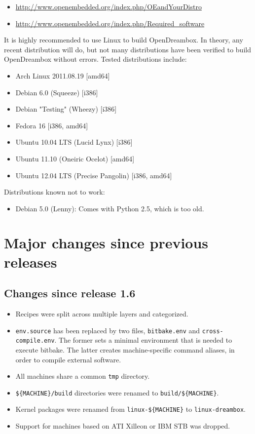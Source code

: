 \documentclass[a4paper]{article}
\newcommand{\shell}[1]{\texttt{\small #1}}
\begin{document}
   \begin{itemize}
     \item \url{http://www.openembedded.org/index.php/OEandYourDistro}
     \item \url{http://www.openembedded.org/index.php/Required\_software}
   \end{itemize}

   It is highly recommended to use Linux to build OpenDreambox. In theory,
   any recent distribution will do, but not many distributions have been
   verified to build OpenDreambox without errors. Tested distributions
   include:

   \begin{itemize}
     \item Arch Linux 2011.08.19 [amd64]
     \item Debian 6.0 (Squeeze) [i386]
     \item Debian "Testing" (Wheezy) [i386]
     \item Fedora 16 [i386, amd64]
     \item Ubuntu 10.04 LTS (Lucid Lynx) [i386]
     \item Ubuntu 11.10 (Oneiric Ocelot) [amd64]
     \item Ubuntu 12.04 LTS (Precise Pangolin) [i386, amd64]
   \end{itemize}

   Distributions known not to work:

   \begin{itemize}
     \item Debian 5.0 (Lenny): Comes with Python 2.5, which is too old.
   \end{itemize}

\pagebreak

\section{Major changes since previous releases}

  \subsection{Changes since release 1.6}
    \begin{itemize}
      \item Recipes were split across multiple layers and categorized.
      \item \shell{env.source} has been replaced by two files,
        \shell{bitbake.env} and \shell{cross-compile.env}. The former sets a minimal
        environment that is needed to execute bitbake. The latter creates
        machine-specific command aliases, in order to compile external software.
      \item All machines share a common \shell{tmp} directory.
      \item \shell{\$\{MACHINE\}/build} directories were renamed to \shell{build/\$\{MACHINE\}}.
      \item Kernel packages were renamed from \shell{linux-\$\{MACHINE\}} to \shell{linux-dreambox}.
      \item Support for machines based on ATI Xilleon or IBM STB was dropped.
    \end{itemize}
\end{document}

